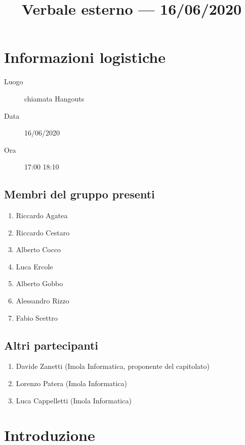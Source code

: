 \documentclass{article}
\title{Verbale esterno --- 16/06/2020}
\begin{document}


\section{Informazioni logistiche}%
\label{sec:informazioni_logistiche}

\begin{description}
  \item [Luogo] chiamata Hangouts
  \item [Data] 16/06/2020
  \item [Ora] 17:00  18:10
\end{description}

\subsection{Membri del gruppo presenti}%
\label{sub:membri_del_gruppo_presenti}

\begin{enumerate}
  \item Riccardo Agatea
  \item Riccardo Cestaro
  \item Alberto Cocco
  \item Luca Ercole
  \item Alberto Gobbo
  \item Alessandro Rizzo
  \item Fabio Scettro
\end{enumerate}


\subsection{Altri partecipanti}%
\label{sub:altri_partecipanti}

\begin{enumerate}
  \item Davide Zanetti (Imola Informatica, proponente del capitolato)
  \item Lorenzo Patera (Imola Informatica)
  \item Luca Cappelletti (Imola Informatica)
\end{enumerate}


\section{Introduzione}%
\label{sec:introduzione}
\end{document}
